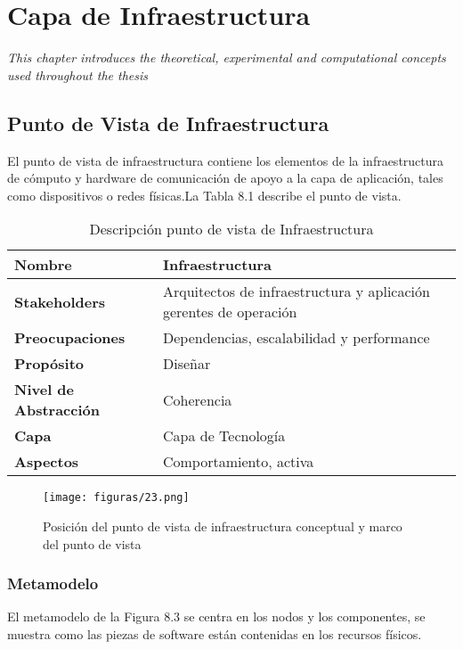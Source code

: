 \chapter{Capa de Infraestructura}
\label{chap:Infraestructura}
\textit{This chapter introduces the theoretical, experimental and computational concepts used throughout the thesis}
\vspace{2ex}\vfill
\minitoc
\newpage

\section{Punto de Vista de Infraestructura}
El punto de vista de infraestructura contiene los elementos de la infraestructura de cómputo y hardware de comunicación de apoyo a la capa de aplicación, tales como dispositivos o redes físicas.La Tabla 8.1 describe el punto de vista.

  \begin{table}[!h]
  	\centering
  	\begin{tabular}{lp{8cm}}
  		\toprule
  		\textbf{Nombre} & \textbf{Infraestructura} \\
  		\midrule
  		\textbf{Stakeholders} & Arquitectos de infraestructura y aplicación gerentes de operación \\
  		\textbf{Preocupaciones} & Dependencias, escalabilidad y performance  \\
  		\textbf{Propósito} & Diseñar \\
  		\textbf{Nivel de Abstracción} & Coherencia \\
  		\textbf{Capa} & Capa de Tecnología \\
  		\textbf{Aspectos} & Comportamiento, activa \\
  		\bottomrule
  	\end{tabular}
  	\captionsetup{width=.95\textwidth}
  	\caption{Descripción punto de vista de Infraestructura}
  	\label{tabla14}
  \end{table}

  \begin{figure}[!h]
	\centering
	\texttt{[image: figuras/23.png]}
	\captionsetup{width=.95\textwidth}
	\caption{Posición del punto de vista de infraestructura conceptual y marco del punto de vista}
	\label{figura23}
  \end{figure}

  \subsection{Metamodelo}
  El metamodelo de la Figura 8.3 se centra en los nodos y los componentes, se muestra como las piezas de software están contenidas en los recursos físicos.

